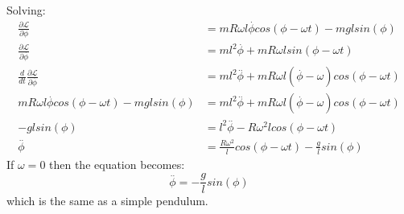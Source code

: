 \documentclass[a4paper,12pt]{article}
\newcommand{\F}[2]{\ensuremath{\frac{#1}{#2}}}
\newcommand{\vel}[1]{\overset{.}{#1}}
\newcommand{\acc}[1]{\overset{..}{#1}}
\begin{document}
Solving:
\begin{align*}
\F{\partial{\mathcal{L}}}{\partial{\phi}}&=mR\omega l\vel{\phi}cos(\phi-\omega t)-mglsin(\phi)\\
\F{\partial{\mathcal{L}}}{\partial{\vel{\phi}}}&=ml^2\vel{\phi}+mR\omega lsin(\phi-\omega t)\\
\F{d}{dt}\F{\partial{\mathcal{L}}}{\partial{\vel{\phi}}}&=ml^2\acc{\phi}+mR\omega l(\vel{\phi}-\omega)cos(\phi-\omega t)\\
mR\omega l\vel{\phi}cos(\phi-\omega t)-mglsin(\phi)&=ml^2\acc{\phi}+mR\omega l(\vel{\phi}-\omega)cos(\phi-\omega t)\\
-glsin(\phi)&=l^2\acc{\phi}-R\omega^2 lcos(\phi-\omega t)\\
\acc{\phi}&=\F{R\omega^2}{l}cos(\phi-\omega t)-\F{g}{l}sin(\phi)
\end{align*}
If $\omega=0$ then the equation becomes:
\[\acc{\phi}=-\F{g}{l}sin(\phi)\]
which is the same as a simple pendulum.
\end{document}
